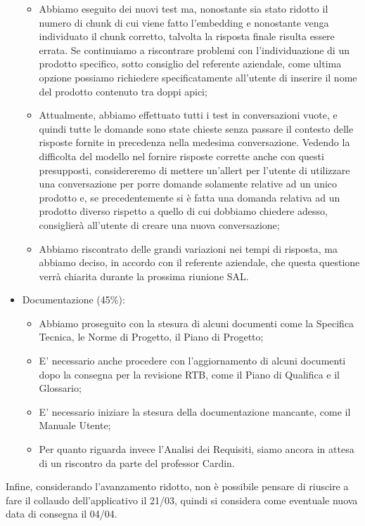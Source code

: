 \begin{itemize}
\begin{itemize}
        \item Abbiamo eseguito dei nuovi test ma, nonostante sia stato ridotto il numero di chunk di cui viene fatto l'embedding e nonostante venga individuato il chunk corretto, talvolta la risposta finale risulta essere errata. Se continuiamo a riscontrare problemi con l'individuazione di un prodotto specifico, sotto consiglio del referente aziendale, come ultima opzione possiamo richiedere specificatamente all'utente di inserire il nome del prodotto contenuto tra doppi apici;
        \item Attualmente, abbiamo effettuato tutti i test in conversazioni vuote, e quindi tutte le domande sono state chieste senza passare il contesto delle risposte fornite in precedenza nella medesima conversazione. Vedendo la difficolta del modello nel fornire risposte corrette anche con questi presupposti, considereremo di mettere un'allert per l'utente di utilizzare una conversazione per porre domande solamente relative ad un unico prodotto e, se precedentemente si è fatta una domanda relativa ad un prodotto diverso rispetto a quello di cui dobbiamo chiedere adesso, consiglierà all'utente di creare una nuova conversazione;
        \item Abbiamo riscontrato delle grandi variazioni nei tempi di risposta, ma abbiamo deciso, in accordo con il referente aziendale, che questa questione verrà chiarita durante la prossima riunione SAL.
    \end{itemize}
    \item Documentazione (45\%): 
    \begin{itemize}
        \item Abbiamo proseguito con la stesura di alcuni documenti come la Specifica Tecnica, le Norme di Progetto, il Piano di Progetto;
        \item E' necessario anche procedere con l'aggiornamento di alcuni documenti dopo la consegna per la revisione RTB, come il Piano di Qualifica e il Glossario;
        \item E' necessario iniziare la stesura della documentazione mancante, come il Manuale Utente;
        \item Per quanto riguarda invece l'Analisi dei Requisiti, siamo ancora in attesa di un riscontro da parte del professor Cardin.
    \end{itemize}
\end{itemize}
Infine, considerando l'avanzamento ridotto, non è possibile pensare di riuscire a fare il collaudo dell'applicativo il 21/03, quindi si considera come eventuale nuova data di consegna il 04/04.
